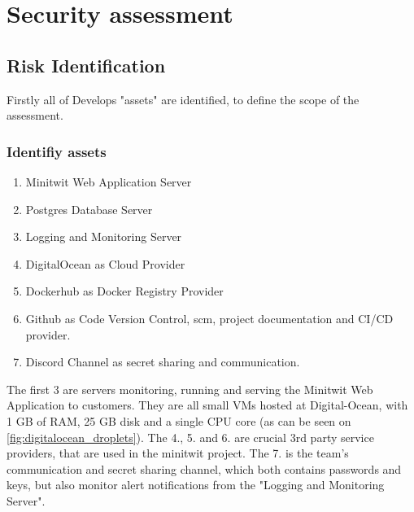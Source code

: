 \section{Security assessment}\label{app:security_ass}

\subsection{Risk Identification}

Firstly all of Develops "assets" are identified, to define the scope of the assessment. 
\subsubsection{Identifiy assets}
\begin{enumerate}
    \item Minitwit Web Application Server
    \item Postgres Database Server
    \item Logging and Monitoring Server
    \item DigitalOcean as Cloud Provider
    \item Dockerhub as Docker Registry Provider
    \item Github as Code Version Control, \acrshort{scm}, project documentation and CI/CD provider.
    \item Discord Channel as secret sharing and communication.
\end{enumerate}

The first 3 are servers monitoring, running and serving the Minitwit Web Application to customers. They are all small VMs hosted at Digital-Ocean, with 1 GB of RAM, 25 GB disk and a single CPU core (as can be seen on \autoref{fig:digitalocean_droplets}). 
The 4., 5. and 6. are crucial 3rd party service providers, that are used in the minitwit project.
The 7. is the team's communication and secret sharing channel, which both contains passwords and keys, but also monitor alert notifications from the "Logging and Monitoring Server".  


